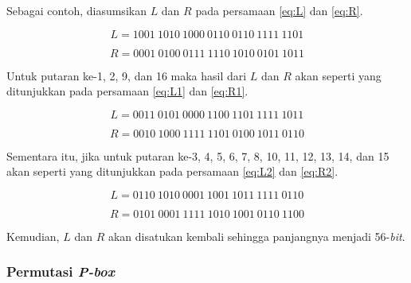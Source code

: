 Sebagai contoh, diasumsikan \begin{math}L\end{math} dan \begin{math}R\end{math} pada persamaan \ref{eq:L} dan \ref{eq:R}.

\begin{equation}
	L = 1001\: 1010\: 1000\: 0110\: 0110\: 1111\: 1101
	\label{eq:L}
\end{equation}

\begin{equation}
	R = 0001\: 0100\: 0111\: 1110\: 1010\: 0101\: 1011
	\label{eq:R}
\end{equation}

Untuk putaran ke-1, 2, 9, dan 16 maka hasil dari \begin{math}L\end{math} dan \begin{math}R\end{math} akan seperti yang ditunjukkan pada persamaan \ref{eq:L1} dan \ref{eq:R1}.

\begin{equation}
	L = 0011\: 0101\: 0000\: 1100\: 1101\: 1111\: 1011
	\label{eq:L1}
\end{equation}

\begin{equation}
	R = 0010\: 1000\: 1111\: 1101\: 0100\: 1011\: 0110
	\label{eq:R1}
\end{equation}

Sementara itu, jika untuk putaran ke-3, 4, 5, 6, 7, 8, 10, 11, 12, 13, 14, dan 15 akan seperti yang ditunjukkan pada persamaan \ref{eq:L2} dan \ref{eq:R2}.

\begin{equation}
	L = 0110\: 1010\: 0001\: 1001\: 1011\: 1111\: 0110
	\label{eq:L2}
\end{equation}

\begin{equation}
	R = 0101\: 0001\: 1111\: 1010\: 1001\: 0110\: 1100
	\label{eq:R2}
\end{equation}

Kemudian, \begin{math}L\end{math} dan \begin{math}R\end{math} akan disatukan kembali sehingga panjangnya menjadi 56-\textit{bit}.

\subsubsection{Permutasi \textit{P-box}}

